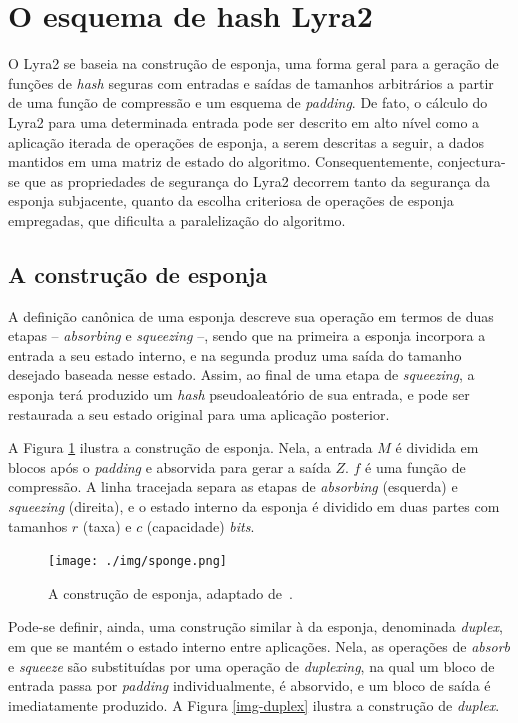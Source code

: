 \documentclass{article}
\begin{document}
\section{O esquema de hash Lyra2}

O Lyra2 se baseia na construção de esponja, uma forma geral para a
geração de funções de \emph{hash} seguras com entradas e saídas de
tamanhos arbitrários a partir de uma função de compressão e um esquema
de \emph{padding}. De fato, o cálculo do Lyra2 para uma determinada entrada pode ser
descrito em alto nível como a aplicação iterada de operações de esponja,
a serem descritas a seguir, a dados mantidos em uma matriz de estado do
algoritmo. Consequentemente, conjectura-se que as propriedades de
segurança do Lyra2 decorrem tanto da segurança da esponja subjacente,
quanto da escolha criteriosa de operações de esponja empregadas, que
dificulta a paralelização do algoritmo.

\subsection{A construção de esponja}

A definição canônica de uma esponja \cite{sponge} descreve sua operação
em termos de duas etapas -- \emph{absorbing} e \emph{squeezing} --,
sendo que na primeira a esponja incorpora a entrada a seu estado
interno, e na segunda produz uma saída do tamanho desejado baseada nesse
estado. Assim, ao final de uma etapa de \emph{squeezing}, a esponja terá
produzido um \emph{hash} pseudoaleatório de sua entrada, e pode ser
restaurada a seu estado original para uma aplicação posterior.

A Figura \ref{img-sponge} ilustra a construção de esponja. Nela, a
entrada $M$ é dividida em blocos após o \emph{padding} e absorvida
para gerar a saída $Z$. $f$ é uma função de compressão. A linha
tracejada separa as etapas de \emph{absorbing} (esquerda) e
\emph{squeezing} (direita), e o estado interno da esponja é dividido em
duas partes com tamanhos $r$ (taxa) e $c$ (capacidade)
\emph{bits}.

\begin{figure}[htbp]
\centering
\texttt{[image: ./img/sponge.png]}
\caption{A construção de esponja, adaptado de~\cite{sponge}.\label{img-sponge}}
\end{figure}

Pode-se definir, ainda, uma construção similar à da esponja, denominada
\emph{duplex}, em que se mantém o estado interno entre aplicações. Nela, as
operações de \emph{absorb} e \emph{squeeze} são substituídas por uma operação
de \emph{duplexing}, na qual um bloco de entrada passa por \emph{padding}
individualmente, é absorvido, e um bloco de saída é imediatamente produzido. A
Figura \ref{img-duplex} ilustra a construção de \emph{duplex}.
\end{document}
